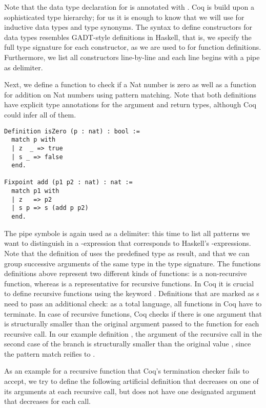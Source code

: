 Note that the data type declaration for  is annotated with .
Coq is build upon a sophisticated type hierarchy; for us it is enough to know that we will use  for inductive data types and type synonyms.
The syntax to define constructors for data types resembles GADT-style definitions in Haskell, that is, we specify the full type signature for each constructor, as we are used to for function definitions.
Furthermore, we list all constructors line-by-line and each line begins with a pipe \cinl{|} as delimiter.

Next, we define a function to check if a Nat number is zero as well as a function for addition on Nat numbers using pattern matching.
Note that both definitions have explicit type annotations for the argument and return types, although Coq could infer all of them.

\begin{verbatim}
Definition isZero (p : nat) : bool :=
  match p with
  | z  _ => true
  | s _ => false
  end.

Fixpoint add (p1 p2 : nat) : nat :=
  match p1 with
  | z   => p2
  | s p => s (add p p2)
  end.
\end{verbatim}

The pipe symbole \cinl{|} is again used as a delimiter: this time to list all patterns we want to distinguish in a -expression that corresponds to Haskell's -expressions.
Note that the definition of  uses the predefined  type as result, and that we can group successive arguments of the same type in the type signature.
The functions definitions above represent two different kinds of functions:  is a non-recursive function, whereas  is a representative for recursive functions.
In Coq it is crucial to define recursive functions using the keyword .
Definitions that are marked as s need to pass an additional check: as a total language, all functions in Coq have to terminate.
In case of recursive functions, Coq checks if there is one argument that is structurally smaller than the original argument passed to the function for each recursive call.
In our example definition , the argument  of the recursive call in the second case of the branch is structurally smaller than the original value , since the pattern match reifies  to .

As an example for a recursive function that Coq's termination checker fails to accept, we try to define the following artificial definition that decreases on one of its arguments at each recursive call, but does not have one designated argument that decreases for each call.

